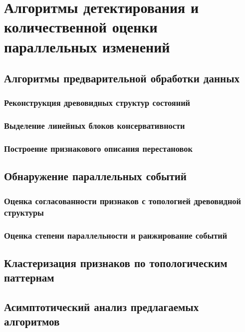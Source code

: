 \chapter{Алгоритмы детектирования и количественной оценки параллельных изменений}
\label{chap:parallel_events}

\section{Алгоритмы предварительной обработки данных}
\label{sec:data_preprocessing}

\subsection{Реконструкция древовидных структур состояний}
\label{subsec:tree_reconstruction}

\subsection{Выделение линейных блоков консервативности}
\label{subsec:conservation_blocks}

\subsection{Построение признакового описания перестановок}
\label{subsec:permutation_features}

\section{Обнаружение параллельных событий}
\label{sec:parallel_events_detection}

\subsection{Оценка согласованности признаков с топологией древовидной структуры}
\label{subsec:feature_consistency}

\subsection{Оценка степени параллельности и ранжирование событий}
\label{subsec:parallel_events_ranking}

\section{Кластеризация признаков по топологическим паттернам}
\label{sec:topological_patterns}

\section{Асимптотический анализ предлагаемых алгоритмов}
\label{sec:asymptotic_analysis}
